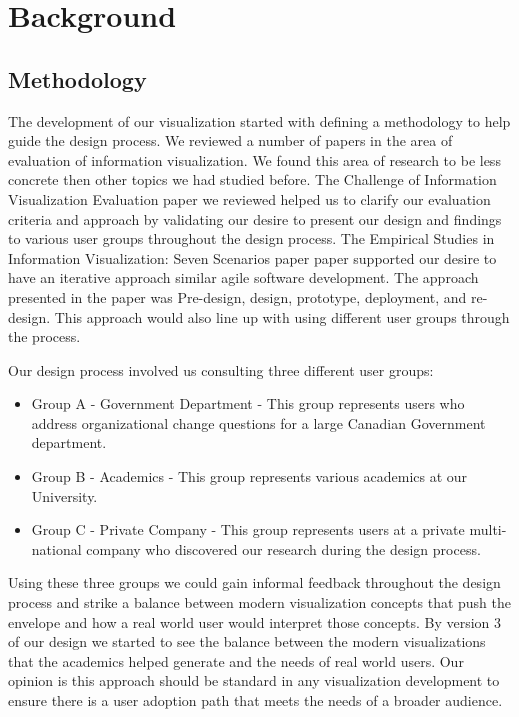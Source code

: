 \documentclass[journal]{vgtc}                %
\begin{document}
\section{Background}

\subsection{Methodology}
The development of our visualization started with defining a methodology to help guide the design process.  We reviewed a number of papers in the area of evaluation of information visualization.  We found this area of research to be less concrete then other topics we had studied before.  The Challenge of Information Visualization Evaluation\cite{challengeofinfoviseval} paper we reviewed helped us to clarify our evaluation criteria and approach by validating our desire to present our design and findings to various user groups throughout the design process.  The Empirical Studies in Information Visualization: Seven Scenarios paper\cite{sevenscenarios} paper supported our desire to have an iterative approach similar agile software development.  The approach presented in the paper was Pre-design, design, prototype, deployment, and re-design.  This approach would also line up with using different user groups through the process.

Our design process involved us consulting three different user groups:
\begin{itemize}
	\item Group A - Government Department - This group represents users who address organizational change questions for a large Canadian Government department. 
	\item Group B - Academics - This group represents various academics at our University.
	\item Group C - Private Company - This group represents users at a private multi-national company who discovered our research during the design process.
\end{itemize}

Using these three groups we could gain informal feedback throughout the design process and strike a balance between modern visualization concepts that push the envelope and how a real world user would interpret those concepts.  By version 3 of our design we started to see the balance between the modern visualizations that the academics helped generate and the needs of real world users.  Our opinion is this approach should be standard in any visualization development to ensure there is a user adoption path that meets the needs of a broader audience.
\end{document}
